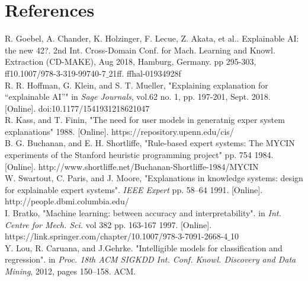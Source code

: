 \documentclass[12]{article}
\begin{document}
\section*{References}
%
\renewcommand{\section}[2]{}%
\begin{thebibliography}{1}
\singlespacing


 R. Goebel, A. Chander, K. Holzinger, F. Lecue, Z. Akata, et al.. Explainable AI: the new 42?. 2nd Int. Cross-Domain Conf. for Mach. Learning and Knowl. Extraction (CD-MAKE), Aug 2018, Hamburg, Germany. pp 295-303, ff10.1007/978-3-319-99740-7$\_$21ff. ffhal-01934928f \\


   R. R. Hoffman, G. Klein, and S. T. Mueller, "Explaining explanation for “explainable AI”" in  \textit{Sage Journals}, vol.62 no. 1, pp. 197-201, Sept. 2018. [Online]. doi:10.1177/1541931218621047\\
  
     R. Kass, and T. Finin, "The need for user models in generatnig exper system explanations" 1988. [Online]. https://repository.upenn.edu/cis/\\

     B. G. Buchanan, and E. H. Shortliffe, "Rule-based expert systems:
The MYCIN experiments of the Stanford heuristic programming project" pp. 754 1984. [Online]. http://www.shortliffe.net/Buchanan-Shortliffe-1984/MYCIN\\


     W. Swartout, C. Paris, and J. Moore, "Explanations in knowledge systems: design for explainable expert systems".  \textit{IEEE Expert} pp. 58–64 1991. [Online]. http://people.dbmi.columbia.edu/\\

     I. Bratko, "Machine learning: between accuracy and interpretability". in \textit{Int. Centre for Mech. Sci.} vol 382 pp. 163-167 1997. [Online]. https://link.springer.com/chapter/10.1007/978-3-7091-2668-4$\_$10\\



 Y. Lou, R. Caruana, and J.Gehrke. "Intelligible models for classification and regression". in  \textit{Proc. 18th ACM SIGKDD Int. Conf.  Knowl. Discovery and Data Mining}, 2012, pages 150–158. ACM.


\end{thebibliography}
\end{document}
